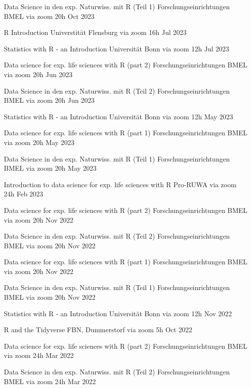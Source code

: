 \documentclass[11pt,a4paper,]{awesome-cv}
\begin{document}
\begin{cvhonors}
\cvhonor
{Data Science in den exp. Naturwiss. mit R (Teil 1)  }
{Forschungseinrichtungen BMEL via zoom}
{20h}
{Oct 2023  }

\cvhonor
{R Introduction  }
{Universtität Flensburg via zoom}
{16h}
{Jul 2023  }

\cvhonor
{Statistics with R - an Introduction  }
{Universität Bonn via zoom}
{12h}
{Jul 2023  }

\cvhonor
{Data science for exp. life sciences with R (part 2)  }
{Forschungseinrichtungen BMEL via zoom}
{20h}
{Jun 2023  }

\cvhonor
{Data Science in den exp. Naturwiss. mit R (Teil 2)  }
{Forschungseinrichtungen BMEL via zoom}
{20h}
{Jun 2023  }

\cvhonor
{Statistics with R - an Introduction  }
{Universität Bonn via zoom}
{12h}
{May 2023  }

\cvhonor
{Data science for exp. life sciences with R (part 1)  }
{Forschungseinrichtungen BMEL via zoom}
{20h}
{May 2023  }

\cvhonor
{Data Science in den exp. Naturwiss. mit R (Teil 1)  }
{Forschungseinrichtungen BMEL via zoom}
{20h}
{May 2023  }

\cvhonor
{Introduction to data science for exp. life sciences with R  }
{Pro-RUWA via zoom}
{24h}
{Feb 2023  }

\cvhonor
{Data science for exp. life sciences with R (part 2)  }
{Forschungseinrichtungen BMEL via zoom}
{20h}
{Nov 2022  }

\cvhonor
{Data Science in den exp. Naturwiss. mit R (Teil 2)  }
{Forschungseinrichtungen BMEL via zoom}
{20h}
{Nov 2022  }

\cvhonor
{Data science for exp. life sciences with R (part 1)  }
{Forschungseinrichtungen BMEL via zoom}
{20h}
{Nov 2022  }

\cvhonor
{Data Science in den exp. Naturwiss. mit R (Teil 1)  }
{Forschungseinrichtungen BMEL via zoom}
{20h}
{Nov 2022  }

\cvhonor
{Statistics with R - an Introduction  }
{Universität Bonn via zoom}
{12h}
{Nov 2022  }

\cvhonor
{R and the {Tidyverse}  }
{FBN, Dummerstorf via zoom}
{5h}
{Oct 2022  }

\cvhonor
{Data science for exp. life sciences with R (part 2)  }
{Forschungseinrichtungen BMEL via zoom}
{24h}
{Mar 2022  }

\cvhonor
{Data Science in den exp. Naturwiss. mit R (Teil 2)  }
{Forschungseinrichtungen BMEL via zoom}
{24h}
{Mar 2022  }


\end{cvhonors}
\end{document}
